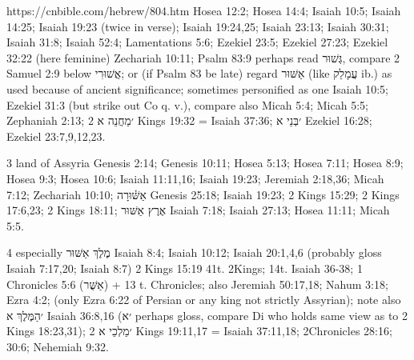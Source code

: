 https://cnbible.com/hebrew/804.htm
Hosea 12:2; Hosea 14:4; Isaiah 10:5; Isaiah 14:25; Isaiah 19:23 (twice in verse); Isaiah 19:24,25; Isaiah 23:13; Isaiah 30:31; Isaiah 31:8; Isaiah 52:4; Lamentations 5:6; Ezekiel 23:5; Ezekiel 27:23; Ezekiel 32:22 (here feminine) Zechariah 10:11; Psalm 83:9 perhaps read גְּשׁוּר, compare 2 Samuel 2:9 below אֲשׁוּרִי; or (if Psalm 83 be late) regard אַשּׁוּר (like עֲמָלֵק ib.) as used because of ancient significance; sometimes personified as one Isaiah 10:5; Ezekiel 31:3 (but strike out Co q. v.), compare also Micah 5:4; Micah 5:5; Zephaniah 2:13; ׳מַחֲנֵה א 2 Kings 19:32 = Isaiah 37:36; ׳בְּנֵי א Ezekiel 16:28; Ezekiel 23:7,9,12,23.

3 land of Assyria Genesis 2:14; Genesis 10:11; Hosea 5:13; Hosea 7:11; Hosea 8:9; Hosea 9:3; Hosea 10:6; Isaiah 11:11,16; Isaiah 19:23; Jeremiah 2:18,36; Micah 7:12; Zechariah 10:10; אַשּׁ֫וּרָה Genesis 25:18; Isaiah 19:23; 2 Kings 15:29; 2 Kings 17:6,23; 2 Kings 18:11; אֶרֶץ אַשּׁוּר Isaiah 7:18; Isaiah 27:13; Hosea 11:11; Micah 5:5.

4 especially מֶלֶךְ אַשּׁוּר Isaiah 8:4; Isaiah 10:12; Isaiah 20:1,4,6 (probably gloss Isaiah 7:17,20; Isaiah 8:7) 2 Kings 15:19 41t. 2Kings; 14t. Isaiah 36-38; 1 Chronicles 5:6 (אַשֻּׁר) + 13 t. Chronicles; also Jeremiah 50:17,18; Nahum 3:18; Ezra 4:2; (only Ezra 6:22 of Persian or any king not strictly Assyrian); note also ׳הַמֶּלֶךְ א Isaiah 36:8,16 (׳א perhaps gloss, compare Di who holds same view as to 2 Kings 18:23,31); ׳מַלְכֵי א 2 Kings 19:11,17 = Isaiah 37:11,18; 2Chronicles 28:16; 30:6; Nehemiah 9:32.









